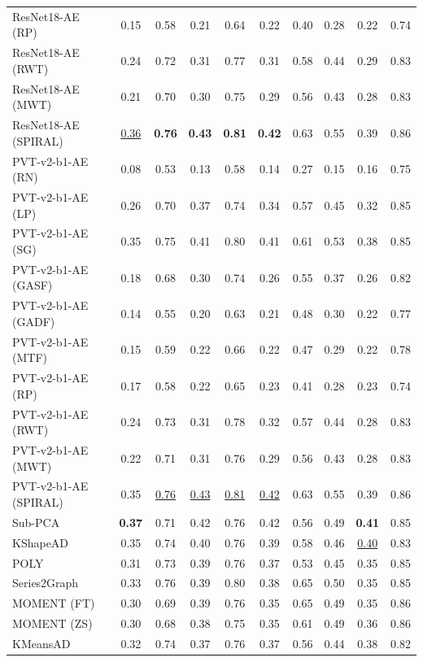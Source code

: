 \begin{table}
{\begin{tabular}{l|c|c|c|c|c|c|c|c|c}
ResNet18-AE (RP) & 0.15 & 0.58 & 0.21 & 0.64 & 0.22 & 0.40 & 0.28 & 0.22 & 0.74 \\
ResNet18-AE (RWT) & 0.24 & 0.72 & 0.31 & 0.77 & 0.31 & 0.58 & 0.44 & 0.29 & 0.83 \\
ResNet18-AE (MWT) & 0.21 & 0.70 & 0.30 & 0.75 & 0.29 & 0.56 & 0.43 & 0.28 & 0.83 \\
ResNet18-AE (SPIRAL) & \underline{0.36} & \textbf{0.76} & \textbf{0.43} & \textbf{0.81} & \textbf{0.42} & 0.63 & 0.55 & 0.39 & 0.86 \\
\midrule
PVT-v2-b1-AE (RN) & 0.08 & 0.53 & 0.13 & 0.58 & 0.14 & 0.27 & 0.15 & 0.16 & 0.75 \\
PVT-v2-b1-AE (LP) & 0.26 & 0.70 & 0.37 & 0.74 & 0.34 & 0.57 & 0.45 & 0.32 & 0.85 \\
PVT-v2-b1-AE (SG) & 0.35 & 0.75 & 0.41 & 0.80 & 0.41 & 0.61 & 0.53 & 0.38 & 0.85 \\
PVT-v2-b1-AE (GASF) & 0.18 & 0.68 & 0.30 & 0.74 & 0.26 & 0.55 & 0.37 & 0.26 & 0.82 \\
PVT-v2-b1-AE (GADF) & 0.14 & 0.55 & 0.20 & 0.63 & 0.21 & 0.48 & 0.30 & 0.22 & 0.77 \\
PVT-v2-b1-AE (MTF) & 0.15 & 0.59 & 0.22 & 0.66 & 0.22 & 0.47 & 0.29 & 0.22 & 0.78 \\
PVT-v2-b1-AE (RP) & 0.17 & 0.58 & 0.22 & 0.65 & 0.23 & 0.41 & 0.28 & 0.23 & 0.74 \\
PVT-v2-b1-AE (RWT) & 0.24 & 0.73 & 0.31 & 0.78 & 0.32 & 0.57 & 0.44 & 0.28 & 0.83 \\
PVT-v2-b1-AE (MWT) & 0.22 & 0.71 & 0.31 & 0.76 & 0.29 & 0.56 & 0.43 & 0.28 & 0.83 \\
PVT-v2-b1-AE (SPIRAL) & 0.35 & \underline{0.76} & \underline{0.43} & \underline{0.81} & \underline{0.42} & 0.63 & 0.55 & 0.39 & 0.86 \\
\midrule
Sub-PCA & \textbf{0.37} & 0.71 & 0.42 & 0.76 & 0.42 & 0.56 & 0.49 & \textbf{0.41} & 0.85 \\
KShapeAD & 0.35 & 0.74 & 0.40 & 0.76 & 0.39 & 0.58 & 0.46 & \underline{0.40} & 0.83 \\
POLY & 0.31 & 0.73 & 0.39 & 0.76 & 0.37 & 0.53 & 0.45 & 0.35 & 0.85 \\
Series2Graph & 0.33 & 0.76 & 0.39 & 0.80 & 0.38 & 0.65 & 0.50 & 0.35 & 0.85 \\
MOMENT (FT) & 0.30 & 0.69 & 0.39 & 0.76 & 0.35 & 0.65 & 0.49 & 0.35 & 0.86 \\
MOMENT (ZS) & 0.30 & 0.68 & 0.38 & 0.75 & 0.35 & 0.61 & 0.49 & 0.36 & 0.86 \\
KMeansAD & 0.32 & 0.74 & 0.37 & 0.76 & 0.37 & 0.56 & 0.44 & 0.38 & 0.82 \\

\end{tabular}}
\end{table}
